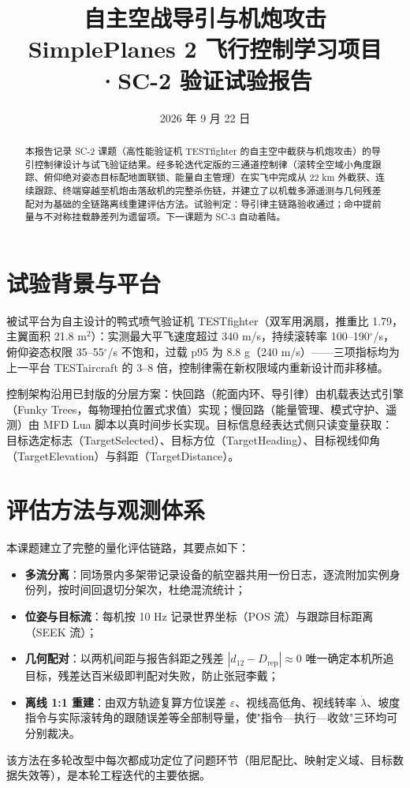 \documentclass[12pt,UTF8,a4paper]{ctexart}
\title{\textbf{自主空战导引与机炮攻击}\\[0.5em]
\large SimplePlanes 2 飞行控制学习项目·SC-2 验证试验报告}
\author{}
\date{2026 年 9 月 22 日}
\begin{document}
\maketitle
\thispagestyle{empty}

\begin{abstract}
本报告记录 SC-2 课题（高性能验证机 TESTfighter 的自主空中截获与机炮攻击）的导引控制律设计与试飞验证结果。经多轮迭代定版的三通道控制律（滚转全空域小角度跟踪、俯仰绝对姿态目标配地面联锁、能量自主管理）在实飞中完成从 22 km 外截获、连续跟踪、终端穿越至机炮击落敌机的完整杀伤链，并建立了以机载多源遥测与几何残差配对为基础的全链路离线重建评估方法。试验判定：导引律主链路验收通过；命中提前量与不对称挂载静差列为遗留项。下一课题为 SC-3 自动着陆。
\end{abstract}

\section{试验背景与平台}
被试平台为自主设计的鸭式喷气验证机 TESTfighter（双军用涡扇，推重比 1.79，主翼面积 21.8 m$^2$）：实测最大平飞速度超过 340 m/s，持续滚转率 100--190$^\circ$/s，俯仰姿态权限 35--55$^\circ$/s 不饱和，过载 p95 为 8.8 g（240 m/s）——三项指标均为上一平台 TESTaircraft 的 3--8 倍，控制律需在新权限域内重新设计而非移植。

控制架构沿用已封版的分层方案：快回路（舵面内环、导引律）由机载表达式引擎（Funky Trees，每物理拍位置式求值）实现；慢回路（能量管理、模式守护、遥测）由 MFD Lua 脚本以真时间步长实现。目标信息经表达式侧只读变量获取：目标选定标志（TargetSelected）、目标方位（TargetHeading）、目标视线仰角（TargetElevation）与斜距（TargetDistance）。

\section{评估方法与观测体系}
本课题建立了完整的量化评估链路，其要点如下：
\begin{itemize}
\item \textbf{多流分离}：同场景内多架带记录设备的航空器共用一份日志，逐流附加实例身份列，按时间回退切分架次，杜绝混流统计；
\item \textbf{位姿与目标流}：每机按 10 Hz 记录世界坐标（POS 流）与跟踪目标距离（SEEK 流）；
\item \textbf{几何配对}：以两机间距与报告斜距之残差 $|d_{12}-D_{\mathrm{rep}}|\approx 0$ 唯一确定本机所追目标，残差达百米级即判配对失败，防止张冠李戴；
\item \textbf{离线 1:1 重建}：由双方轨迹复算方位误差 $\varepsilon$、视线高低角、视线转率 $\dot\lambda$、坡度指令与实际滚转角的跟随误差等全部制导量，使"指令—执行—收敛"三环均可分别裁决。
\end{itemize}
该方法在多轮改型中每次都成功定位了问题环节（阻尼配比、映射定义域、目标数据失效等），是本轮工程迭代的主要依据。
\end{document}
